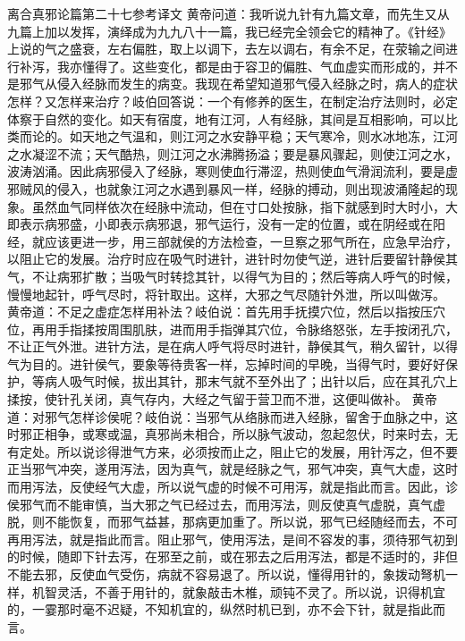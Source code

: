 \documentclass[12pt,UTF8]{ctexbook}
\begin{document}
离合真邪论篇第二十七参考译文
黄帝问道：我听说九针有九篇文章，而先生又从九篇上加以发挥，演绎成为九九八十一篇，我已经完全领会它的精神了。《针经》上说的气之盛衰，左右偏胜，取上以调下，去左以调右，有余不足，在荥输之间进行补泻，我亦懂得了。这些变化，都是由于容卫的偏胜、气血虚实而形成的，并不是邪气从侵入经脉而发生的病变。我现在希望知道邪气侵入经脉之时，病人的症状怎样？又怎样来治疗？岐伯回答说：一个有修养的医生，在制定治疗法则时，必定体察于自然的变化。如天有宿度，地有江河，人有经脉，其间是互相影响，可以比类而论的。如天地之气温和，则江河之水安静平稳；天气寒冷，则水冰地冻，江河之水凝涩不流；天气酷热，则江河之水沸腾扬溢；要是暴风骤起，则使江河之水，波涛汹涌。因此病邪侵入了经脉，寒则使血行滞涩，热则使血气滑润流利，要是虚邪贼风的侵入，也就象江河之水遇到暴风一样，经脉的搏动，则出现波涌隆起的现象。虽然血气同样依次在经脉中流动，但在寸口处按脉，指下就感到时大时小，大即表示病邪盛，小即表示病邪退，邪气运行，没有一定的位置，或在阴经或在阳经，就应该更进一步，用三部就侯的方法检查，一旦察之邪气所在，应急早治疗，以阻止它的发展。治疗时应在吸气时进针，进针时勿使气逆，进针后要留针静侯其气，不让病邪扩散；当吸气时转捻其针，以得气为目的；然后等病人呼气的时候，慢慢地起针，呼气尽时，将针取出。这样，大邪之气尽随针外泄，所以叫做泻。
黄帝道：不足之虚症怎样用补法？岐伯说：首先用手抚摸穴位，然后以指按压穴位，再用手指揉按周围肌肤，进而用手指弹其穴位，令脉络怒张，左手按闭孔穴，不让正气外泄。进针方法，是在病人呼气将尽时进针，静侯其气，稍久留针，以得气为目的。进针侯气，要象等待贵客一样，忘掉时间的早晚，当得气时，要好好保护，等病人吸气时候，拔出其针，那末气就不至外出了；出针以后，应在其孔穴上揉按，使针孔关闭，真气存内，大经之气留于营卫而不泄，这便叫做补。
黄帝道：对邪气怎样诊侯呢？岐伯说：当邪气从络脉而进入经脉，留舍于血脉之中，这时邪正相争，或寒或温，真邪尚未相合，所以脉气波动，忽起忽伏，时来时去，无有定处。所以说诊得泄气方来，必须按而止之，阻止它的发展，用针泻之，但不要正当邪气冲突，遂用泻法，因为真气，就是经脉之气，邪气冲突，真气大虚，这时而用泻法，反使经气大虚，所以说气虚的时候不可用泻，就是指此而言。因此，诊侯邪气而不能审慎，当大邪之气已经过去，而用泻法，则反使真气虚脱，真气虚脱，则不能恢复，而邪气益甚，那病更加重了。所以说，邪气已经随经而去，不可再用泻法，就是指此而言。阻止邪气，使用泻法，是间不容发的事，须待邪气初到的时候，随即下针去泻，在邪至之前，或在邪去之后用泻法，都是不适时的，非但不能去邪，反使血气受伤，病就不容易退了。所以说，懂得用针的，象拨动弩机一样，机智灵活，不善于用针的，就象敲击木椎，顽钝不灵了。所以说，识得机宜的，一霎那时毫不迟疑，不知机宜的，纵然时机已到，亦不会下针，就是指此而言。
\end{document}
